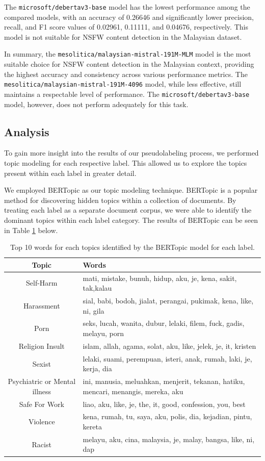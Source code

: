 \documentclass[preprint]{article}
\begin{document}
The \texttt{microsoft/debertav3-base} model has the lowest performance among the compared models, with an accuracy of 0.26646 and significantly lower precision, recall, and F1 score values of 0.02961, 0.11111, and 0.04676, respectively. This model is not suitable for NSFW content detection in the Malaysian dataset.

In summary, the \texttt{mesolitica/malaysian-mistral-191M-MLM} model is the most suitable choice for NSFW content detection in the Malaysian context, providing the highest accuracy and consistency across various performance metrics. The \texttt{mesolitica/malaysian-mistral-191M-4096} model, while less effective, still maintains a respectable level of performance. The \texttt{microsoft/debertav3-base} model, however, does not perform adequately for this task.

\subsection{Analysis}

To gain more insight into the results of our pseudolabeling process, we performed topic modeling for each respective label. This allowed us to explore the topics present within each label in greater detail.

We employed BERTopic as our topic modeling technique. BERTopic is a popular method for discovering hidden topics within a collection of documents. By treating each label as a separate document corpus, we were able to identify the dominant topics within each label category. The results of BERTopic can be seen in Table \ref*{table:topics} below.

\begin{table}[h!]
  \centering
  \begin{tabular}{|c|l|}
  \hline
  \textbf{Topic} & \textbf{Words} \\
  \hline
  Self-Harm & mati, mistake, bunuh, hidup, aku, je, kena, sakit, tak,kalau \\
  Harassment & sial, babi, bodoh, jialat, perangai, pukimak, kena, like, ni, gila \\
  Porn & seks, lucah, wanita, dubur, lelaki, filem, fuck, gadis, melayu, porn \\
  Religion Insult & islam, allah, agama, solat, aku, like, jelek, je, it, kristen \\
  Sexist & lelaki, suami, perempuan, isteri, anak, rumah, laki, je, kerja, dia \\
  Psychiatric or Mental illness & ini, manusia, meluahkan, menjerit, tekanan, hatiku, mencari, menangis, mereka, aku \\
  Safe For Work & liao, aku, like, je, the, it, good, confession, you, best \\
  Violence & kena, rumah, tu, saya, aku, polis, dia, kejadian, pintu, kereta \\
  Racist & melayu, aku, cina, malaysia, je, malay, bangsa, like, ni, dap \\
  \hline
  \end{tabular}
  \caption{Top 10 words for each topics identified by the BERTopic model for each label.}
\label{table:topics}
\end{table}
\end{document}
